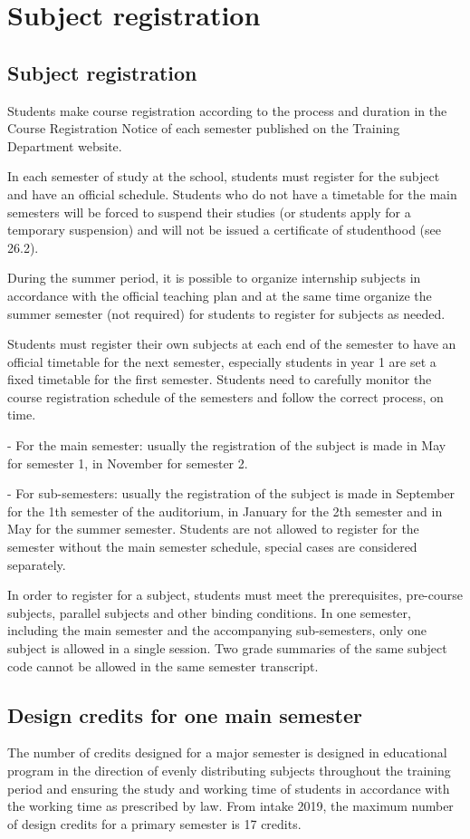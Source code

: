 \section{Subject registration}
\subsection{Subject registration}
Students make course registration according to the process and duration in the Course Registration Notice of each semester published on the Training Department website.

In each semester of study at the school, students must register for the subject and have an official schedule. Students who do not have a timetable for the main semesters will be forced to suspend their studies (or students apply for a temporary suspension) and will not be issued a certificate of studenthood (see 26.2).

During the summer period, it is possible to organize internship subjects in accordance with the official teaching plan and at the same time organize the summer semester (not required) for students to register for subjects as needed.

Students must register their own subjects at each end of the semester to have an official timetable for the next semester, especially students in year 1 are set a fixed timetable for the first semester. Students need to carefully monitor the course registration schedule of the semesters and follow the correct process, on time.

- For the main semester: usually the registration of the subject is made in May for semester 1, in November for semester 2.

- For sub-semesters: usually the registration of the subject is made in September for the 1th semester of the auditorium, in January for the 2th semester and in May for the summer semester. Students are not allowed to register for the semester without the main semester schedule, special cases are considered separately.

In order to register for a subject, students must meet the prerequisites, pre-course subjects, parallel subjects and other binding conditions.
In one semester, including the main semester and the accompanying sub-semesters, only one subject is allowed in a single session.  Two grade summaries of the same subject code cannot be allowed in the same semester transcript.

\subsection{Design credits for one main semester}
The number of credits designed for a major semester is designed in educational program in the direction of evenly distributing subjects throughout the training period and ensuring the study and working time of students in accordance with the working time as prescribed by law. From intake 2019, the maximum number of design credits for a primary semester is 17 credits.

